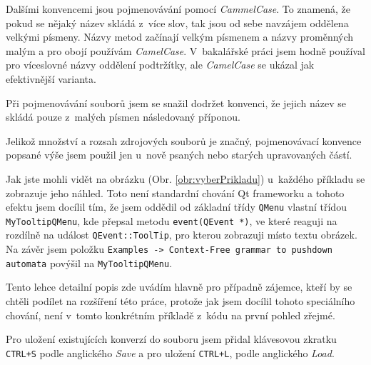 
Dalšími konvencemi jsou pojmenovávání pomocí \textit{CammelCase}. To znamená, že pokud se nějaký název skládá z~více slov, tak jsou od sebe navzájem oddělena velkými písmeny. Názvy metod začínají velkým písmenem a názvy proměnných malým a pro obojí používám \textit{CamelCase}. V~bakalářské práci jsem hodně používal pro víceslovné názvy oddělení podtržítky, ale \textit{CamelCase} se ukázal jak efektivnější varianta. 

Při pojmenovávání souborů jsem se snažil dodržet konvenci, že jejich název se skládá pouze z~malých písmen následovaný příponou.

Jelikož množství a rozsah zdrojových souborů je značný, pojmenovávací konvence popsané výše jsem použil jen u~nově psaných nebo starých upravovaných částí. 


Jak jste mohli vidět na obrázku (Obr. \ref{obr:vyberPrikladu}) u~každého příkladu se zobrazuje jeho náhled. Toto není standardní chování Qt frameworku a tohoto efektu jsem docílil tím, že jsem oddědil od základní třídy \texttt{QMenu} vlastní třídou \texttt{MyTooltipQMenu}, kde přepsal metodu \texttt{event(QEvent *)}, ve které reaguji na rozdílně na událost \texttt{QEvent::ToolTip}, pro kterou zobrazuji místo textu obrázek. Na závěr jsem položku \texttt{Examples -> Context-Free grammar to pushdown automata} povýšil na \texttt{MyTooltipQMenu}.

Tento lehce detailní popis zde uvádím hlavně pro případně zájemce, kteří by se chtěli podílet na rozšíření této práce, protože jak jsem docílil tohoto speciálního chování, není v~tomto konkrétním příkladě z~kódu na první pohled zřejmé.

Pro uložení existujících konverzí do souboru jsem přidal klávesovou zkratku \texttt{CTRL+S} podle anglického \textit{Save} a pro uložení \texttt{CTRL+L}, podle anglického \textit{Load}.

